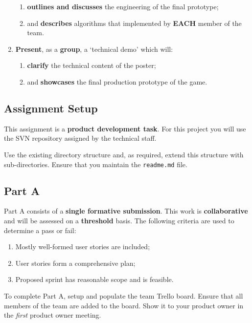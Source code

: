 \documentclass{../fal_assignment}
\begin{document}
\begin{enumerate}[label=(\Alph*)]
\begin{enumerate}[label=\roman*.]
    		\item \textbf{outlines and discusses} the engineering of the final prototype;
    		\item and \textbf{describes} algorithms that implemented by \textbf{EACH} member of the team. 
	\end{enumerate}
    \item \textbf{Present}, as a \textbf{group}, a `technical demo' which will:
    	\begin{enumerate}[label=\roman*.]
    		\item \textbf{clarify} the technical content of the poster;
    		\item and \textbf{showcases} the final production prototype of the game.
	\end{enumerate}
\end{enumerate}
  
\subsection*{Assignment Setup}

This assignment is a \textbf{product development task}. For this project you will use the SVN repository assigned by the technical staff.

Use the existing directory structure and, as required, extend this structure with sub-directories. Ensure that you maintain the \texttt{readme.md} file. 

\subsection*{Part A}

Part A consists of a \textbf{single formative submission}. This work is \textbf{collaborative} and will be assessed on a \textbf{threshold} basis. The following criteria are used to determine a pass or fail:

\begin{enumerate}[label=(\alph*)]
	\item Mostly well-formed user stories are included;
	\item User stories form a comprehensive plan;
	\item Proposed sprint has reasonable scope and is feasible.
\end{enumerate}

To complete Part A, setup and populate the team Trello board. Ensure that all members of the team are added to the board. Show it to your product owner in the \textit{first} product owner meeting.
\end{document}
